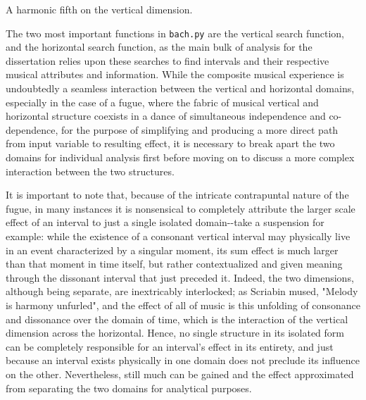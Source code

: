 \begin{Example}[H]
    \begin{center}
    \caption{ A harmonic fifth on the vertical dimension. }
    \end{center}
\end{Example}
    
    The two most important functions in \texttt{bach.py} are the vertical
search function, and the horizontal search function, as the main bulk of
analysis for the dissertation relies upon these searches to find
intervals and their respective musical attributes and information. While
the composite musical experience is undoubtedly a seamless interaction
between the vertical and horizontal domains, especially in the case of a
fugue, where the fabric of musical vertical and horizontal structure
coexists in a dance of simultaneous independence and co-dependence, for
the purpose of simplifying and producing a more direct path from input
variable to resulting effect, it is necessary to break apart the two
domains for individual analysis first before moving on to discuss a more
complex interaction between the two structures.

It is important to note that, because of the intricate contrapuntal
nature of the fugue, in many instances it is nonsensical to completely
attribute the larger scale effect of an interval to just a single
isolated domain-\/-take a suspension for example: while the existence of
a consonant vertical interval may physically live in an event
characterized by a singular moment, its sum effect is much larger than
that moment in time itself, but rather contextualized and given meaning
through the dissonant interval that just preceded it. Indeed, the two
dimensions, although being separate, are inextricably interlocked; as
Scriabin mused, "Melody is harmony unfurled", and the effect of all of
music is this unfolding of consonance and dissonance over the domain of
time, which is the interaction of the vertical dimension across the
horizontal. Hence, no single structure in its isolated form can be
completely responsible for an interval's effect in its entirety, and
just because an interval exists physically in one domain does not
preclude its influence on the other. Nevertheless, still much can be
gained and the effect approximated from separating the two domains for
analytical purposes.

